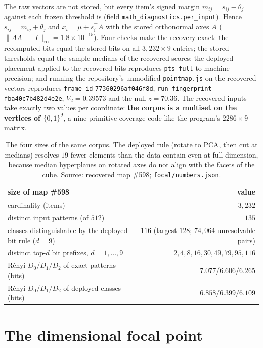 \documentclass[11pt,a4paper]{article}
\theoremstyle{plain}
\theoremstyle{remark}
\begin{document}
The raw vectors are not stored, but every item's signed margin $m_{ij}=s_{ij}-\theta_j$ against each frozen threshold is (field \texttt{math\_diagnostics.per\_input}). Hence $s_{ij}=m_{ij}+\theta_j$ and $x_i=\mu+s_i^{\top}A$ with the stored orthonormal axes $A$ ($\|AA^{\top}-I\|_\infty=1.8\times10^{-15}$). Four checks make the recovery exact: the recomputed bits equal the stored bits on all $3{,}232\times9$ entries; the stored thresholds equal the sample medians of the recovered scores; the deployed placement applied to the recovered bits reproduces \texttt{pts\_full} to machine precision; and running the repository's unmodified \texttt{pointmap.js} on the recovered vectors reproduces \texttt{frame\_id} \texttt{77360296af046f8d}, \texttt{run\_fingerprint} \texttt{fba40c7b482d4e2e}, $V_2=0.39573$ and the null $z=70.36$. The recovered inputs take exactly two values per coordinate: \textbf{the corpus is a multiset on the vertices of $\{0,1\}^9$}, a nine-primitive coverage code like the program's $2286\times9$ matrix.

\begin{table}[h]\centering\small
\begin{tabular}{lr}
\toprule
size of map \#598 & value \\
\midrule
cardinality (items) & $3{,}232$ \\
distinct input patterns (of $512$) & $135$ \\
classes distinguishable by the deployed bit rule ($d=9$) & $116$ (largest $128$; $74{,}064$ unresolvable pairs) \\
distinct top-$d$ bit prefixes, $d=1,\dots,9$ & $2, 4, 8, 16, 30, 49, 79, 95, 116$ \\
Rényi $D_0/D_1/D_2$ of exact patterns (bits) & $7.077/6.606/6.265$ \\
Rényi $D_0/D_1/D_2$ of deployed classes (bits) & $6.858/6.399/6.109$ \\
\bottomrule
\end{tabular}
\caption{The four sizes of the same corpus. The deployed rule (rotate to PCA, then cut at medians) resolves $19$ fewer elements than the data contain even at full dimension, because median hyperplanes on rotated axes do not align with the facets of the cube. Source: recovered map \#598; \texttt{focal/numbers.json}.}
\label{tab:sizes}
\end{table}

\section{The dimensional focal point}
\label{sec:focal}
\end{document}
